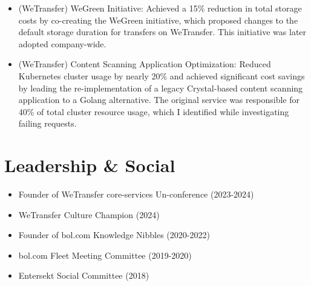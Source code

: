 \documentclass[]{friggeri-cv} %
\begin{document}
\begin{itemize}
    \item (WeTransfer) WeGreen Initiative: Achieved a 15\% reduction in total storage costs by co-creating the WeGreen initiative, which proposed changes to the default storage duration for transfers on WeTransfer. This initiative was later adopted company-wide.
    \item (WeTransfer) Content Scanning Application Optimization: Reduced Kubernetes cluster usage by nearly 20\% and achieved significant cost savings by leading the re-implementation of a legacy Crystal-based content scanning application to a Golang alternative. The original service was responsible for 40\% of total cluster resource usage, which I identified while investigating failing requests.
\end{itemize}

\section{Leadership \& Social}

\begin{itemize}
    \item Founder of WeTransfer core-services Un-conference (2023-2024)
    \item WeTransfer Culture Champion (2024)
    \item Founder of bol.com Knowledge Nibbles (2020-2022)
    \item bol.com Fleet Meeting Committee (2019-2020)
    \item Entersekt Social Committee (2018)
\end{itemize}
\end{document}
